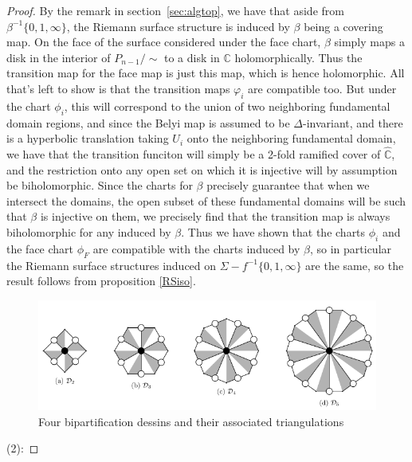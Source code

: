 \documentclass[reqno]{amsart}
\theoremstyle{definition}
\theoremstyle{remark}
\begin{document}
\begin{proof}
        By the remark in section~\ref{sec:algtop}, we have that aside from
        $\beta^{-1}\{0,1,\infty\}$, the Riemann surface structure is induced by
        $\beta$ being a covering map. On the face of the surface considered 
        under the face chart, $\beta$ simply
        maps a disk in the interior of $P_{n-1}/\sim$ to a disk in $\mathbb{C}$ holomorphically. Thus the transition map for the face map is just this map, which is hence holomorphic. All that's left to show is that the transition
        maps $\varphi_i$ are compatible too. But under the chart $\phi_i$, this
        will correspond to the union of two neighboring fundamental domain regions,
        and since the Belyi map is assumed to be $\Delta$-invariant, and there
        is a hyperbolic translation taking $U_i$ onto the neighboring fundamental domain, we have that the transition funciton will simply be a 2-fold ramified
        cover of $\hat{\mathbb{C}}$, and the restriction onto any open set
        on which it is injective will by assumption be biholomorphic. Since
        the charts for $\beta$ precisely guarantee that when we intersect the domains,
        the open subset of these fundamental domains will be such that $\beta$ is
        injective on them, we precisely find that the transition map is always biholomorphic for any induced by $\beta$. Thus we have shown that
        the charts $\phi_i$ and the face chart $\phi_F$ are compatible with the
        charts induced by $\beta$, so in particular the Riemann surface structures
        induced on $\Sigma -
        f^{-1}\{0,1,\infty\}$ are the same, so the result follows from proposition 
        \ref{RSiso}.
        \begin{figure}[http]
    \centering
    \includegraphics[width=1\linewidth]{bipartification-dessin-D_k.png}
    \caption{Four bipartification dessins and their
    associated triangulations}
    \label{fig:bipartification-dessin-D_k}
\end{figure}

        (2):


\end{proof}
\end{document}
